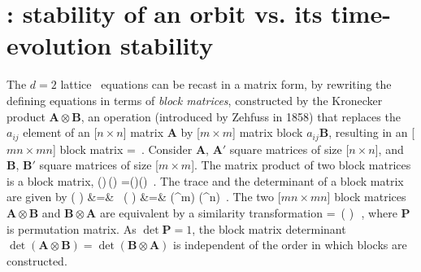 
\section{{\HillDet}:
            stability of an orbit vs. its time-evolution stability}
\label{s:Hill}

The $d=2$ lattice \catlatt\ equations can be recast in a matrix form, by
rewriting the defining equations in terms of \emph{block
matrices}, constructed by the
 {Kronecker
product} $\mathbf{A}\otimes\mathbf{B}$, an operation
(introduced by Zehfuss in 1858) that replaces the $a_{ij}$
element of an [$n\times{n}$] matrix $\mathbf{A}$ by [$m\times{m}$]
matrix block $a_{ij}\mathbf{B}$, resulting in an [$mn\times mn$] block
matrix
\beq
{}\otimes{} =
\,.
Consider $\mathbf{A}$, $\mathbf{A'}$ square matrices of size
[$n\times{n}$], and $\mathbf{B}$, $\mathbf{B'}$ square matrices of size
[$m\times{m}$].
The matrix product of two block matrices is a block
matrix,
\beq
(\otimes{})\,(\otimes{})
  =()\otimes ()
  \,.
The trace and the determinant of a block matrix are given by
\bea
\tr( \otimes {})
    &=& \tr{}\,\tr{}
    \continue
\det\left( \otimes {}\right)
    &=& \det\left(^{m}\right) \det\left(^{n}\right)
\,.
\label{wikiKron2}
\eea
The two [$mn\times mn$] block matrices $\mathbf{A}\otimes\mathbf{B}$ and
$\mathbf{B}\otimes\mathbf{A}$ are equivalent by a similarity
transformation
\beq
{} \otimes {}
= \,( \otimes {} )\,
\,,
where $\mathbf{P}$ is permutation matrix. As $\det{\mathbf{P}}=1$,
the block matrix determinant
$\det\left(\mathbf{A}\otimes\mathbf{B}\right)
=
\det\left(\mathbf{B}\otimes\mathbf{A}\right)$
is independent of the order in which blocks are constructed.

